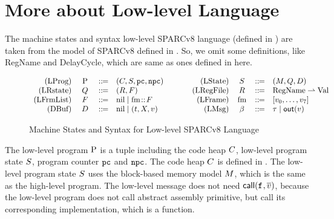 \section{More about Low-level Language}
\label{sec:more-llang}

The machine states and syntax low-level SPARCv8 language 
(defined in \Fig{\ref{fig:machine-state-syntax-low-level-sparc}}) 
are taken from the model of SPARCv8 defined in 
\Fig{\ref{fig:Machine States and Language for SPARC Code}}. 
So, we omit some definitions, like RegName and DelayCycle, 
which are same as ones defined in 
\Fig{\ref{fig:Machine States and Language for SPARC Code}} here.

\begin{figure}[!h]
    \centering
    \vspace{-2em}
    \[
        \begin{array}{rcclcrccl}
            \text{(LProg)} & \ \prog \ & \define & (\code, \state, \pc, \npc) 
            & \quad \ \ &
            \text{(LState)} & \ \state \ & \define & (\Mem, \Rstate, \DBuf) 
            \\
            \text{(LRstate)} & \ \Rstate \ & \define & (\RFile, \Wstack) & &
            \text{(LRegFile)} & \RFile & \define & 
                \text{RegName} \rightharpoonup \text{Val} \\
            \text{(LFrmList)} & \Wstack & \define & \nil \sepline \fm \stCons \Wstack 
            & &
            \text{(LFrame)} & \fm & \define & [\val_0, \dots, \val_7]
            \\
            \text{(DBuf)} & \DBuf & \define & \nil \sepline (\tick, X, \val) & & 
            \text{(LMsg)} & \ \lmsg \ & \define & \empmsg \sepline \outEvt{\val}
        \end{array}
    \]
    \vspace{-1em}
    \caption{Machine States and Syntax for Low-level SPARCv8 Language}
    \label{fig:machine-state-syntax-low-level-sparc}
    \vspace{-1em}
\end{figure}
The low-level program $\text{P}$ is a tuple including the code heap $C$, 
low-level program state $S$, program counter $\texttt{pc}$ and $\texttt{npc}$. The 
code heap $C$ is defined in \Fig{\ref{fig:syntax-of-concur-pseudo-sparc}}. 
The low-level program state $S$ uses the block-based memory model $M$, 
which is the same as the high-level program. The low-level message does not need 
$\textsf{call}({\texttt{f}_{}, \overline{v}})$, because the low-level program does not call 
abstract assembly primitive, but call its corresponding implementation, which 
is a function. 

